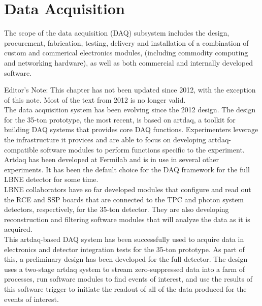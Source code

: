 

\chapter{Data Acquisition}
\label{ch:trig}

The scope of the data acquisition (DAQ) subsystem includes the 
design, procurement, fabrication, testing, delivery and installation 
of a combination of custom and commerical electronics modules, (including 
commodity computing and networking hardware), as well as both commercial 
and internally developed software. 

\notestart
Editor's Note: This chapter has not been updated since 2012, with the exception of this note.  Most of the
text from 2012 is no longer valid. \\

The data acquisition system has been evolving since the 2012 design. The design for the 35-ton prototype, the most recent,
 is based on artdaq, a toolkit for building DAQ systems that provides core DAQ functions. Experimenters leverage the infrastructure it provices and are able to focus on developing artdaq-compatible software modules to perform functions specific to the experiment. \\ 

Artdaq has been developed at Fermilab and is in use in several other experiments.  It has been the default choice for the DAQ framework for the full LBNE detector for some time. \\ 

LBNE collaborators have so far developed modules that configure and read out the RCE and SSP boards that are connected to the TPC and photon system detectors, respectively, for the 35-ton detector.  They are also developing reconstruction and filtering software modules that will analyze the data as it is acquired.  \\ 

This artdaq-based DAQ system %
has been successfully used to acquire data in electronics and detector integration tests for the 35-ton prototype.   As part of this, a preliminary design has been developed for the full detector. The design uses a two-stage artdaq system to stream zero-suppressed data into a farm of processes, run software modules to find events of interest, and use the results of this software trigger to initiate the readout of all of the data produced for the events of interest. \\ 

